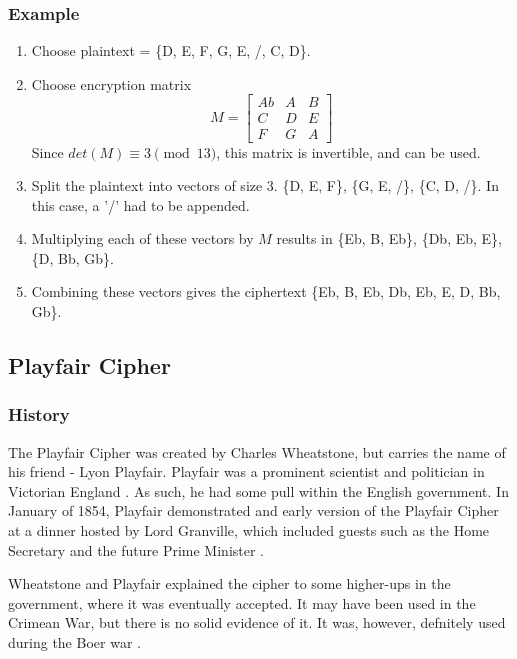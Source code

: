 \documentclass[14pt]{article}
\begin{document}
    	\subsubsection{Example}
            \begin{enumerate}
                \item Choose plaintext = \{D, E, F, G, E, /, C, D\}.
                \item Choose encryption matrix
            	\[
                M =
        		\begin{bmatrix}
        			Ab & A & B \\
        			C  & D & E \\
        			F  & G & A
        		\end{bmatrix}
            	\]
                Since $det(M) \equiv 3 \pmod{13}$, this matrix is invertible, and can be used.
                \item Split the plaintext into vectors of size 3. \{D, E, F\}, \{G, E, /\}, \{C, D, /\}. In this case, a '/' had to be appended.
                \item Multiplying each of these vectors by $M$ results in \{Eb, B, Eb\}, \{Db, Eb, E\}, \{D, Bb, Gb\}.
                \item Combining these vectors gives the ciphertext \{Eb, B, Eb, Db, Eb, E, D, Bb, Gb\}.
            \end{enumerate}

	\subsection{Playfair Cipher}
    	\subsubsection{History}
        The Playfair Cipher was created by Charles Wheatstone, but carries the name of his friend - Lyon Playfair. Playfair was a prominent scientist and politician in Victorian England \cite{Kahn}. As such, he had some pull within the English government. In January of 1854, Playfair demonstrated and early version of the Playfair Cipher at a dinner hosted by Lord Granville, which included guests such as the Home Secretary and the future Prime Minister \cite{Kahn}.
        
        Wheatstone and Playfair explained the cipher to some higher-ups in the government, where it was eventually accepted. It may have been used in the Crimean War, but there is no solid evidence of it. It was, however, defnitely used during the Boer war \cite{Kahn}.
    
\end{document}
